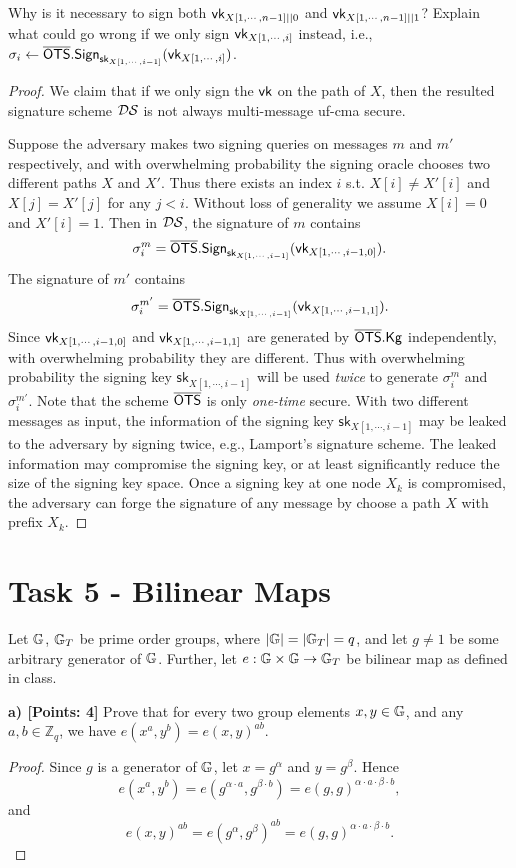 \documentclass[12pt]{article}
\newcommand{\Z}{\mathbb{Z}}
\theoremstyle{definition}
\newcommand{\Kg}{\textsf{Kg}}
\newcommand{\sk}{\textsf{sk}}
\begin{document}
Why is it necessary to sign both $\textsf{vk}_{X[1,\cdots,n-1]||0}$ and $\textsf{vk}_{X[1,\cdots,n-1]||1}$? Explain what could go wrong if we only sign $\textsf{vk}_{X[1,\cdots,i]}$ instead, i.e., $\sigma_i \gets \OTS.\Sign_{\sk_{X[1,\cdots,i-1]}}(\vk_{X[1,\cdots,i]})$.
\begin{proof}
We claim that if we only sign the $\textsf{vk}$ on the path of $X$, then the resulted signature scheme $\mathcal{DS}$ is not always multi-message uf-cma secure.

Suppose the adversary makes two signing queries on messages $m$ and $m'$ respectively, and with overwhelming probability the signing oracle chooses two different paths $X$ and $X'$. Thus there exists an index $i$ s.t. $X[i] \not= X'[i]$ and $X[j] = X'[j]$ for any $j<i$. Without loss of generality we assume $X[i]=0$ and $X'[i]=1$. Then in $\mathcal{DS}$, the signature of $m$ contains 
$$\sigma_i^m = \OTS.\Sign_{\sk_{X[1,\cdots,i-1]}}(\vk_{X[1,\cdots,i-1,0]}).$$
The signature of $m'$ contains
$$\sigma_i^{m'} = \OTS.\Sign_{\sk_{X[1,\cdots,i-1]}}(\vk_{X[1,\cdots,i-1,1]}).$$
Since $\textsf{vk}_{X[1,\cdots,i-1,0]}$ and $\textsf{vk}_{X[1,\cdots,i-1,1]}$ are generated by $\OTS.\Kg$ independently, with overwhelming probability they are different. Thus with overwhelming probability the signing key $\sk_{X[1,\cdots,i-1]}$ will be used \emph{twice} to generate $\sigma_i^m$ and $\sigma_i^{m'}$. Note that the scheme $\overline{\textsf{OTS}}$ is only \emph{one-time} secure. With two different messages as input, the information of the signing key $\sk_{X[1,\cdots,i-1]}$ may be leaked to the adversary by signing twice, e.g., Lamport's signature scheme. The leaked information may compromise the signing key, or at least significantly reduce the size of the signing key space. Once a signing key at one node $X_k$ is compromised, the adversary can forge the signature of any message by choose a path $X$ with prefix $X_k$.
\end{proof}

\section{Task 5 - Bilinear Maps}
Let $\mathbb{G}$, $\mathbb{G}_T$ be prime order groups, where $|\mathbb{G}| = |\mathbb{G}_T| = q$, and let $g \not = 1$ be some arbitrary generator of $\mathbb{G}$. Further, let $e : \mathbb{G} \times \mathbb{G} \to \mathbb{G}_T$ be bilinear map as defined in class.

{\bf a) [Points: 4]} Prove that for every two group elements $x, y \in \mathbb{G}$, and any $a, b \in \Z_q$, we have $e(x^a, y^b) = e(x, y)^{ab}$.
\begin{proof}
Since $g$ is a generator of $\mathbb{G}$, let $x = g^{\alpha}$ and $y = g^{\beta}$. Hence
$$e(x^a, y^b) = e(g^{\alpha \cdot a}, g^{\beta \cdot b}) = e(g,g)^{\alpha \cdot a \cdot \beta \cdot b},$$
and 
$$e(x,y)^{ab} = e(g^{\alpha}, g^{\beta})^{ab} = e(g,g)^{\alpha \cdot a \cdot \beta \cdot b}.$$
\end{proof}
\end{document}
